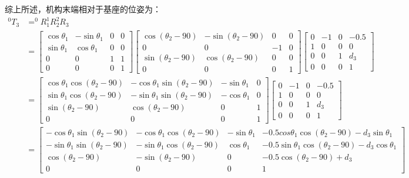\documentclass{ctexart}
\begin{document}
综上所述，机构末端相对于基座的位姿为：
\begin{equation}
	\begin{aligned}
		^0T_3&=^0R_1^1R_2^2R_3\\
		&=\begin{bmatrix}
			\cos\theta_1 & -\sin\theta_1 & 0 & 0 \\
			\sin\theta_1 & \cos\theta_1 & 0 & 0 \\
			0 & 0 & 1 & 1 \\
			0 & 0 & 0 & 1
		\end{bmatrix}\begin{bmatrix}
			\cos(\theta_2-90) & -\sin(\theta_2-90) & 0 & 0 \\
			0 & 0 & -1 & 0 \\
			\sin(\theta_2-90) & \cos(\theta_2-90) & 0 & 0 \\
			0 & 0 & 0 & 1
		\end{bmatrix}\begin{bmatrix}
			0 & -1 & 0 & -0.5 \\
			1 & 0 & 0 & 0\\
			0 & 0 & 1 & d_3 \\
			0 & 0 & 0 & 1
		\end{bmatrix}\\
		&=\begin{bmatrix}
			\cos\theta_1\cos(\theta_2-90) & -\cos\theta_1\sin(\theta_2-90) & -\sin\theta_1 & 0 \\
			\sin\theta_1\cos(\theta_2-90) & -\sin\theta_1\sin(\theta_2-90) & -\cos\theta_1 & 0 \\
			\sin(\theta_2-90) & \cos(\theta_2-90) & 0 & 1\\
			0 & 0 & 0 & 1	
		\end{bmatrix}
		\begin{bmatrix}
			0 & -1 & 0 & -0.5 \\
			1 & 0 & 0 & 0\\
			0 & 0 & 1 & d_3 \\
			0 & 0 & 0 & 1
		\end{bmatrix}\\
		&=
		\begin{bmatrix}
			-\cos\theta_1\sin(\theta_2-90) & -\cos\theta_1\cos(\theta_2-90) & -\sin\theta_1 & -0.5cos\theta_1\cos(\theta_2-90)-d_3\sin\theta_1 \\
			-\sin\theta_1\sin(\theta_2-90) & -\sin\theta_1\cos(\theta_2-90) & \cos\theta_1 & -0.5\sin\theta_1\cos(\theta_2-90)-d_3\cos\theta_1 \\
			\cos(\theta_2-90) & -\sin(\theta_2-90) & 0 & -0.5\cos(\theta_2-90)+d_3 \\
			0 & 0 & 0 & 1
		\end{bmatrix}
	\end{aligned}
\end{equation}
\end{document}
